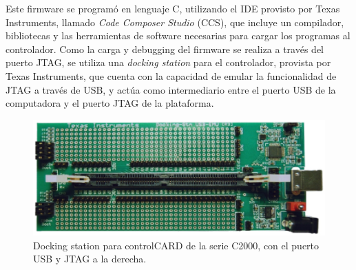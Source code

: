 Este firmware se programó en lenguaje C, utilizando el IDE provisto por Texas Instruments, llamado \textit{Code Composer Studio} (CCS), que incluye un compilador, bibliotecas y las herramientas de software necesarias para cargar los programas al controlador. Como la carga y debugging del firmware se realiza a través del puerto JTAG, se utiliza una \textit{docking station} para el controlador, provista por Texas Instruments, que cuenta con la capacidad de emular la funcionalidad de JTAG a través de USB, y actúa como intermediario entre el puerto USB de la computadora y el puerto JTAG de la plataforma.\\ 

\begin{figure}[h]
    \centering
    \includegraphics[scale=0.25]{Imagenes/Docking Station.png}
    \caption{Docking station para controlCARD de la serie C2000, con el puerto USB y JTAG a la derecha.}
    \label{docking_station}
\end{figure}